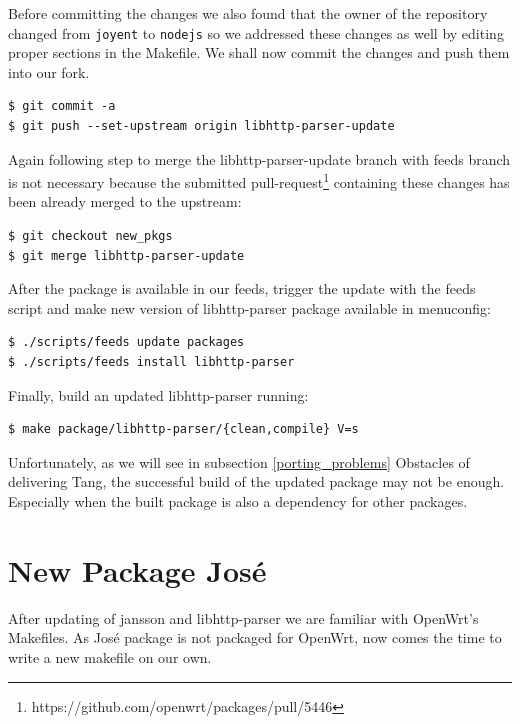 Before committing the changes we also found that the owner of the repository changed from {\tt joyent} to {\tt nodejs} so we addressed these changes as well by editing proper sections in the Makefile.
We shall now commit the changes and push them into our fork.
\begin{lstlisting}[columns=fixed,basicstyle=\ttfamily\footnotesize,tabsize=4,backgroundcolor=\color{yellow!10}]
$ git commit -a
$ git push --set-upstream origin libhttp-parser-update
\end{lstlisting}
Again following step to merge the libhttp-parser-update branch with feeds branch is not necessary because the submitted pull-request\footnote{https://github.com/openwrt/packages/pull/5446} containing these changes has been already merged to the upstream:
\begin{lstlisting}[columns=fixed,basicstyle=\ttfamily\footnotesize,tabsize=4,backgroundcolor=\color{yellow!10}]
$ git checkout new_pkgs
$ git merge libhttp-parser-update
\end{lstlisting}
After the package is available in our feeds, trigger the update with the feeds script and make new version of libhttp-parser package available in menuconfig:
\begin{lstlisting}[columns=fixed,basicstyle=\ttfamily\footnotesize,tabsize=4,backgroundcolor=\color{yellow!10}]
$ ./scripts/feeds update packages
$ ./scripts/feeds install libhttp-parser
\end{lstlisting}
Finally, build an updated libhttp-parser running:
\begin{lstlisting}[columns=fixed,basicstyle=\ttfamily\footnotesize,tabsize=4,backgroundcolor=\color{yellow!10}]
$ make package/libhttp-parser/{clean,compile} V=s
\end{lstlisting}
Unfortunately, as we will see in subsection \ref{porting_problems} Obstacles of delivering Tang, the successful build of the updated package may not be enough.
Especially when the built package is also a dependency for other packages.



\section{New Package José}

After updating of jansson and libhttp-parser we are familiar with OpenWrt's Makefiles.
As José package is not packaged for OpenWrt, now comes the time to write a new makefile on our own.

